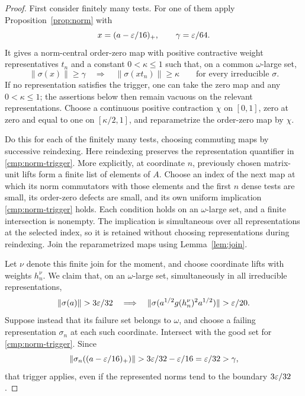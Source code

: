 \begin{proof}
First consider finitely many tests.  For one of them apply
Proposition~\ref{prop:norm} with
\[
 x=(a-\varepsilon/16)_+,
 \qquad \gamma=\varepsilon/64.
\]
It gives a norm-central order-zero map with positive contractive
weight representatives $t_n$ and a constant $0<\kappa\le1$ such
that, on a common $\omega$-large set,
\begin{equation}\label{cmp:norm-trigger}
 \|\sigma(x)\|\ge\gamma
 \quad\Longrightarrow\quad
 \|\sigma(xt_n)\|\ge\kappa
 \qquad\text{for every irreducible }\sigma.
\end{equation}
If no representation satisfies the trigger, one can take the zero
map and any $0<\kappa\le1$; the assertions below then remain
vacuous on the relevant representations.  Choose a continuous
positive contraction $\chi$ on $[0,1]$, zero at zero and equal to
one on $[\kappa/2,1]$, and reparametrize the order-zero map by $\chi$.

Do this for each of the finitely many tests, choosing commuting
maps by successive reindexing.  Here reindexing preserves the
representation quantifier in \eqref{cmp:norm-trigger}.  More
explicitly, at coordinate $n$, previously chosen matrix-unit lifts
form a finite list of elements of $A$.  Choose an index of the next
map at which its norm commutators with those elements and the first
$n$ dense tests are small, its order-zero defects are small, and
its own uniform implication \eqref{cmp:norm-trigger} holds.
Each condition holds on an $\omega$-large set, and a finite
intersection is nonempty.  The implication is simultaneous over
all representations at the selected index, so it is retained
without choosing representations during reindexing.  Join the
reparametrized maps using Lemma~\ref{lem:join}.

Let $\nu$ denote this finite join for the moment, and choose \cpc
coordinate lifts with weights $h_n^\nu$.  We claim that, on an
$\omega$-large set, simultaneously in all irreducible representations,
\begin{equation}\label{cmp:visibility-implication}
 \|\sigma(a)\|>3\eps/32
 \quad\Longrightarrow\quad
 \|\sigma(a^{1/2}g(h_n^\nu)^2a^{1/2})\|>\eps/20.
\end{equation}
Suppose instead that its failure set belongs to $\omega$, and
choose a failing representation $\sigma_n$ at each such coordinate.
Intersect with the good set for \eqref{cmp:norm-trigger}.  Since
\[
 \|\sigma_n((a-\varepsilon/16)_+)\|
   >3\varepsilon/32-\varepsilon/16=\varepsilon/32>\gamma,
\]
that trigger applies, even if the represented norms tend to the
boundary $3\varepsilon/32$.


\end{proof}
